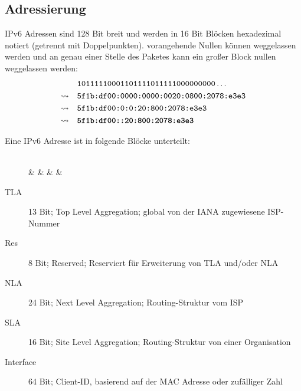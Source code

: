 		\subsection{Adressierung}
			IPv6 Adressen sind 128 Bit breit und werden in 16 Bit Blöcken hexadezimal notiert (getrennt mit Doppelpunkten). vorangehende Nullen können weggelassen werden und an genau einer Stelle des Paketes kann ein großer Block nullen weggelassen werden:
			\begin{align*}
				                 & \quad\texttt{10111110001101111011111000000000}\dots   \\
				\rightsquigarrow & \quad\texttt{5f1b:df00:0000:0000:0020:0800:2078:e3e3} \\
				\rightsquigarrow & \quad\texttt{5f1b:df00:0:0:20:800:2078:e3e3}          \\
				\rightsquigarrow & \quad\textbf{\texttt{5f1b:df00::20:800:2078:e3e3}}
			\end{align*}

			Eine IPv6 Adresse ist in folgende Blöcke unterteilt:
			\begin{figure}[H]
				\centering
				\begin{bytefield}[bitwidth = 7pt]{64}
					 \\
					 &  &  &  &  \\
				\end{bytefield}
			\end{figure}
			\begin{description}
				\item[TLA] 13 Bit; Top Level Aggregation; global von der IANA zugewiesene ISP-Nummer
				\item[Res] 8 Bit; Reserved; Reserviert für Erweiterung von TLA und/oder NLA
				\item[NLA] 24 Bit; Next Level Aggregation; Routing-Struktur vom ISP
				\item[SLA] 16 Bit; Site Level Aggregation; Routing-Struktur von einer Organisation
				\item[Interface] 64 Bit; Client-ID, basierend auf der MAC Adresse oder zufälliger Zahl
			\end{description}

